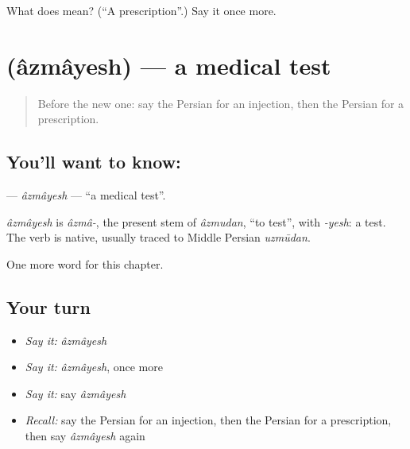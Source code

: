 \begin{tcolorbox}[breakable,colback=teal!4,colframe=teal!35!black,title={Before you move on}]
What does  mean? (\textquotedblleft{}A prescription\textquotedblright{}.) Say it once more.
\end{tcolorbox}
\section[\texorpdfstring{\fa{آزمایش} (âzmâyesh)}{آزمایش (âzmâyesh)}]{ (âzmâyesh) — a medical test}

\label{lesson:FA-C189-azmayesh}



\begin{quote}
Before the new one: say the Persian for an injection, then the Persian for a prescription.
\end{quote}

\subsection*{You'll want to know: }
\textbf{} — \emph{âzmâyesh} — \textquotedblleft{}a medical test\textquotedblright{}.

\begin{cousinweb}
\emph{âzmâyesh} is \emph{âzmâ-}, the present stem of \emph{âzmudan}, \textquotedblleft{}to test\textquotedblright{}, with \emph{-yesh}: a test. The verb is native, usually traced to Middle Persian \emph{uzmūdan}.
\end{cousinweb}

\begin{grammarlens}[title={What you've built}]
One more word for this chapter.
\end{grammarlens}

\subsection*{Your turn}
\begin{itemize}
\raggedright
  \item \emph{Say it:} \emph{âzmâyesh}
  \item \emph{Say it:} \emph{âzmâyesh}, once more
  \item \emph{Say it:} say \emph{âzmâyesh}
  \item \emph{Recall:} say the Persian for an injection, then the Persian for a prescription, then say \emph{âzmâyesh} again
\end{itemize}

